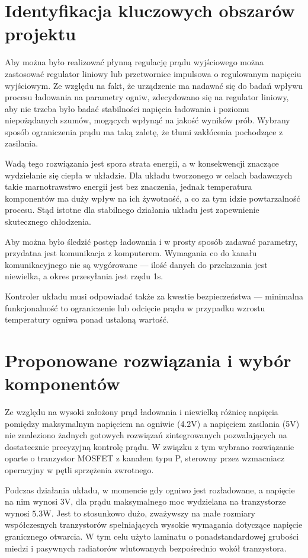 \documentclass[polish,engineer]{polsl-msth}
\begin{document}
\section{Identyfikacja kluczowych obszarów projektu}
Aby można było realizować płynną regulację prądu wyjściowego można zastosować regulator liniowy lub przetwornice impulsowa o regulowanym napięciu wyjściowym. Ze względu na fakt, że urządzenie ma nadawać się do badań wpływu procesu ładowania na parametry ogniw, zdecydowano się na regulator liniowy, aby nie trzeba było badać stabilności napięcia ładowania i poziomu niepożądanych szumów, mogących wpłynąć na jakość wyników prób. Wybrany sposób ograniczenia prądu ma taką zaletę, że tłumi zakłócenia pochodzące z zasilania.

Wadą tego rozwiązania jest spora strata energii, a w konsekwencji znaczące wydzielanie się ciepła w układzie. Dla układu tworzonego w celach badawczych takie marnotrawstwo energii jest bez znaczenia, jednak temperatura komponentów ma duży wpływ na ich żywotność, a co za tym idzie powtarzalność procesu. Stąd istotne dla stabilnego działania układu jest zapewnienie skutecznego chłodzenia.

Aby można było śledzić postęp ładowania i w prosty sposób zadawać parametry, przydatna jest komunikacja z komputerem. Wymagania co do kanału komunikacyjnego nie są wygórowane --- ilość danych do przekazania jest niewielka, a okres przesyłania jest rzędu 1s.

Kontroler układu musi odpowiadać także za kwestie bezpieczeństwa --- minimalna funkcjonalność to ograniczenie lub odcięcie prądu w przypadku wzrostu temperatury ogniwa ponad ustaloną wartość.

\section{Proponowane rozwiązania i wybór komponentów}
Ze względu na wysoki założony prąd ładowania i niewielką różnicę napięcia pomiędzy maksymalnym napięciem na ogniwie (4.2V) a napięciem zasilania (5V) nie znaleziono żadnych gotowych rozwiązań zintegrowanych pozwalających na dostatecznie precyzyjną kontrolę prądu. W związku z tym wybrano rozwiązanie oparte o tranzystor MOSFET z kanałem typu P, sterowny przez wzmacniacz operacyjny w pętli sprzężenia zwrotnego.

Podczas działania układu, w momencie gdy ogniwo jest rozładowane, a napięcie na nim wynosi 3V, dla prądu maksymalnego moc wydzielana na tranzystorze wynosi $5.3\mathrm{W}$. Jest to stosunkowo dużo, zważywszy na małe rozmiary współczesnych tranzystorów spełniających wysokie wymagania dotyczące napięcie granicznego otwarcia. W tym celu użyto laminatu o ponadstandardowej grubości miedzi  i pasywnych radiatorów wlutowanych bezpośrednio wokół tranzystora.
\end{document}
